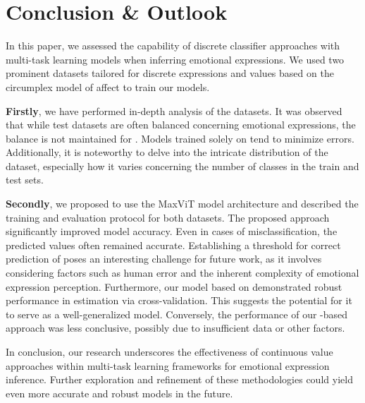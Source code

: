 \section{Conclusion \& Outlook}
\label{sec:conclusion}

In this paper, we assessed the capability of discrete classifier approaches with multi-task learning models when inferring emotional expressions. 
We used two prominent datasets tailored for discrete expressions and values based on the circumplex model of affect to train our models. 

\textbf{Firstly}, we have performed in-depth analysis of the datasets. It was observed that while test datasets are often balanced concerning emotional expressions, the balance is not maintained for \va{}. Models trained solely on \va{} tend to minimize errors. Additionally, it is noteworthy to delve into the intricate distribution of the \emotic{} dataset, especially how it varies concerning the number of classes in the train and test sets. 

\textbf{Secondly}, we proposed to use the MaxViT model architecture and described the training and evaluation protocol for both datasets. The proposed approach significantly improved model accuracy. Even in cases of misclassification, the predicted \va{} values often remained accurate. Establishing a threshold for correct prediction of \va{} poses an interesting challenge for future work, as it involves considering factors such as human error and the inherent complexity of emotional expression perception. Furthermore, our model based on \affectnet{} demonstrated robust performance in \va{} estimation via cross-validation. This suggests the potential for it to serve as a well-generalized model. Conversely, the performance of our \emotic{}-based approach was less conclusive, possibly due to insufficient data or other factors. 

In conclusion, our research underscores the effectiveness of continuous value approaches within multi-task learning frameworks for emotional expression inference. Further exploration and refinement of these methodologies could yield even more accurate and robust models in the future.
